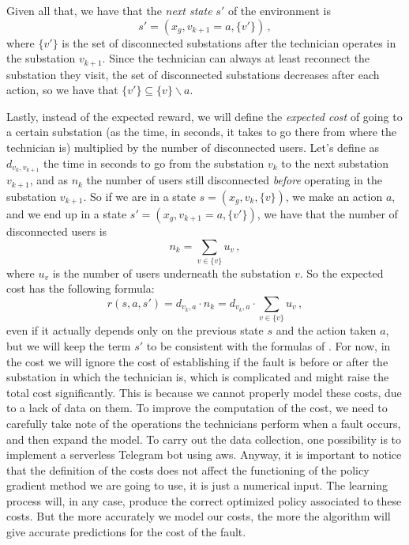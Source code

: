 Given all that, we have that the \emph{next state} $s'$ of the environment is
\begin{equation}
    s' = (x_g, v_{k+1} = a, \{v'\}) \, ,
\end{equation}
where $\{v'\}$ is the set of disconnected substations after the technician operates in the substation $v_{k+1}$. Since the technician can always at least reconnect the substation they visit, the set of disconnected substations decreases after each action, so we have that $\{v'\} \subseteq \{v\} \backslash a$.

Lastly, instead of the expected reward, we will define the \emph{expected cost} of going to a certain substation (as the time, in seconds, it takes to go there from where the technician is) multiplied by the number of disconnected users. Let's define as $d_{v_k, v_{k+1}}$ the time in seconds to go from the substation $v_k$ to the next substation $v_{k+1}$, and as $n_{k}$ the number of users still disconnected \emph{before} operating in the substation $v_{k+1}$. So if we are in a state $s = (x_g, v_k, \{v\})$, we make an action $a$, and we end up in a state $s' = (x_g, v_{k+1} = a, \{v'\})$, we have that the number of disconnected users is
\begin{equation}
    n_{k} = \sum_{v \in \{v\}} u_v \, ,
\end{equation}
where $u_v$ is the number of users underneath the substation $v$. So the expected cost has the following formula:
\begin{equation}
    r(s, a, s') = d_{v_k, a} \cdot n_{k} = d_{v_k, a} \cdot \sum_{v \in \{v\}} u_v \, ,
    \label{eq:expected-cost}
\end{equation}
even if it actually depends only on the previous state $s$ and the action taken $a$, but we will keep the term $s'$ to be consistent with the formulas of \cite{SuttonBarto}.
For now, in the cost we will ignore the cost of establishing if the fault is before or after the substation in which the technician is, which is complicated and might raise the total cost significantly. This is because we cannot properly model these costs, due to a lack of data on them. To improve the computation of the cost, we need to carefully take note of the operations the technicians perform when a fault occurs, and then expand the model. To carry out the data collection, one possibility is to implement a serverless Telegram bot using \acrshort{aws}. 
Anyway, it is important to notice that the definition of the costs does not affect the functioning of the policy gradient method we are going to use, it is just a numerical input. The learning process will, in any case, produce the correct optimized policy associated to these costs. But the more accurately we model our costs, the more the algorithm will give accurate predictions for the cost of the fault.

